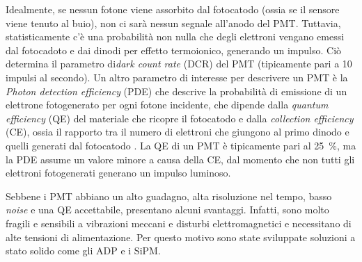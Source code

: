 Idealmente, se nessun fotone viene assorbito dal fotocatodo (ossia se il sensore viene tenuto al buio), non ci sarà nessun segnale all'anodo del PMT. Tuttavia, statisticamente c'è una probabilità non nulla che degli elettroni vengano emessi dal fotocadoto e dai dinodi per effetto termoionico, generando un impulso. Ciò determina il parametro di\textit{dark count rate} (DCR) del PMT (tipicamente pari a 10 impulsi al secondo).
Un altro parametro di interesse per descrivere un PMT è la \textit{Photon detection efficiency} (PDE) che descrive la probabilità di emissione di un elettrone fotogenerato per ogni fotone incidente, che dipende dalla \textit{quantum efficiency} (QE) del materiale che ricopre il fotocatodo e dalla \textit{collection efficiency} (CE), ossia il rapporto tra il numero di elettroni che giungono al primo dinodo e quelli generati dal fotocatodo \cite{Hai2018}. La QE di un PMT è tipicamente pari al \SI{25}{\percent}, ma la PDE assume un valore minore a causa della CE, dal momento che non tutti gli elettroni fotogenerati generano un impulso luminoso.

Sebbene i PMT abbiano un alto guadagno, alta risoluzione nel tempo, basso \textit{noise} e una QE accettabile, presentano alcuni svantaggi. Infatti, sono molto fragili e sensibili a vibrazioni meccani e disturbi elettromagnetici e necessitano di alte tensioni di alimentazione. Per questo motivo sono state sviluppate soluzioni a stato solido come gli ADP e i SiPM.

\newpage
